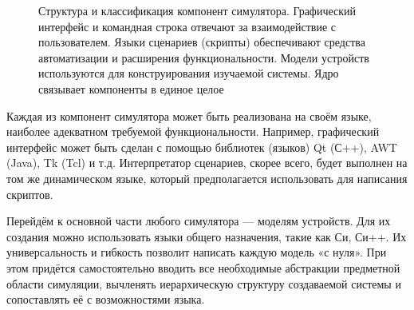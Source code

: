 \begin{figure}[htb]
    \caption[Структура и классификация компонент симулятора]{Структура и классификация компонент симулятора. Графический интерфейс и командная строка отвечают за взаимодействие с пользователем. Языки сценариев (скрипты) обеспечивают средства автоматизации и расширения функциональности. Модели устройств используются для конструирования изучаемой системы. Ядро связывает компоненты в единое целое}
    \label{fig:breakdown}
\end{figure}

Каждая из компонент симулятора может быть реализована на своём языке, наиболее адекватном требуемой функциональности. Например, графический интерфейс может быть сделан с помощью библиотек (языков) Qt (С++), AWT (Java), Tk (Tcl) и т.д. Интерпретатор сценариев, скорее всего, будет выполнен на том же динамическом языке, который предполагается использовать для написания скриптов.

Перейдём к основной части любого симулятора --- моделям устройств. Для их создания можно использовать языки общего назначения, такие как Си, Си++. Их универсальность и гибкость позволит написать каждую модель «с нуля». При этом придётся самостоятельно вводить все необходимые абстракции предметной области симуляции, вычленять иерархическую структуру создаваемой системы и сопоставлять её с возможностями языка.

